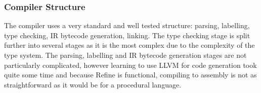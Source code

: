 \subsubsection{Compiler Structure}

The compiler uses a very standard and well tested structure: parsing, labelling, type checking,
IR bytecode generation, linking.
The type checking stage is split further into several stages as it is the most complex due to the
complexity of the type system.
The parsing, labelling and IR bytecode generation stages are not particularly complicated, however
learning to use LLVM for code generation took quite some time and because Refine is functional,
compiling to assembly is not as straightforward as it would be for a procedural language.
